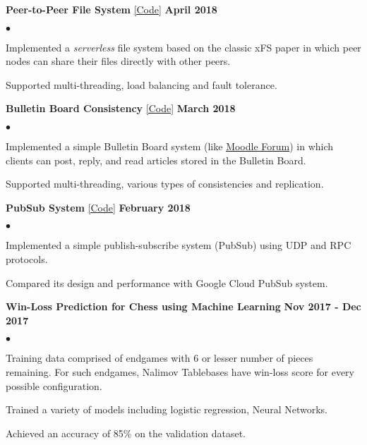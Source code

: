 \documentclass[margin,line]{res}
\newenvironment{list2}{
  \begin{list}{$\bullet$}{%
      \setlength{\itemsep}{0in}
      \setlength{\parsep}{0in} \setlength{\parskip}{0in}
      \setlength{\topsep}{0in} \setlength{\partopsep}{0in} 
      \setlength{\leftmargin}{0.2in}}}{\end{list}}
\begin{document}
\begin{resume}
{\bf Peer-to-Peer File System} \href{https://github.com/kudhru/P2PFileSystem}{\color{blue}[Code]} \hfill {\bf April 2018}\\

\vspace{-.3cm}
\begin{list2}
	\item Implemented a \emph{serverless} file system based on the classic xFS paper in which peer nodes can share their files directly with other peers.
	\item Supported multi-threading, load balancing and fault tolerance.
\end{list2}

{\bf Bulletin Board Consistency} \href{https://github.com/kudhru/Bulletin-Board}{\color{blue}[Code]} \hfill {\bf March 2018}\\

\vspace{-.3cm}
\begin{list2}
	\item Implemented a simple Bulletin Board system (like \href{https://moodle.org}{\color{blue}Moodle Forum}) in which clients can post, reply, and read articles stored in the Bulletin Board.
	\item Supported multi-threading, various types of consistencies and replication.
\end{list2}

{\bf PubSub System} \href{https://github.com/kudhru/publish-subscribe-system}{\color{blue}[Code]} \hfill {\bf February 2018}\\

\vspace{-.3cm}
\begin{list2}
	\item Implemented a simple publish-subscribe system (PubSub) using UDP and RPC protocols.
	\item Compared its design and performance with Google Cloud PubSub system.
\end{list2}

{\bf Win-Loss Prediction for Chess using Machine Learning} \hfill {\bf Nov 2017 - Dec 2017}\\

\vspace{-.3cm}
\begin{list2}
\item Training data comprised of endgames with 6 or lesser number of pieces remaining.
For such endgames, Nalimov Tablebases have win-loss score for every possible configuration.
\item Trained a variety of models including logistic regression, Neural Networks.
\item Achieved an accuracy of 85\% on the validation dataset.
\end{list2}


\end{resume}
\end{document}
